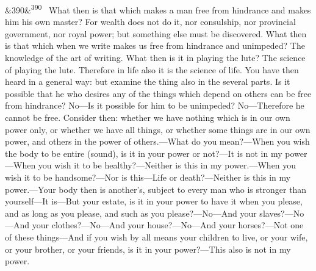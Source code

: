 \documentclass[12pt]{article}
\newcommand{\para}[1][]{\par\noindent\ifx&#1&\else\textsuperscript{\footnotesize #1}~\fi}
\begin{document}
\para[390] What then is that which makes a man free from hindrance and makes him his own master? For wealth does not do it, nor consulship, nor provincial government, nor royal power; but something else must be discovered. What then is that which when we write makes us free from hindrance and unimpeded? The knowledge of the art of writing. What then is it in playing the lute? The science of playing the lute. Therefore in life also it is the science of life. You have then heard in a general way: but examine the thing also in the several parts. Is it possible that he who desires any of the things which depend on others can be free from hindrance? No—Is it possible for him to be unimpeded? No—Therefore he cannot be free. Consider then: whether we have nothing which is in our own power only, or whether we have all things, or whether some things are in our own power, and others in the power of others.—What do you mean?—When you wish the body to be entire (sound), is it in your power or not?—It is not in my power—When you wish it to be healthy?—Neither is this in my power.—When you wish it to be handsome?—Nor is this—Life or death?—Neither is this in my power.—Your body then is another's, subject to every man who is stronger than yourself—It is—But your estate, is it in your power to have it when you please, and as long as you please, and such as you please?—No—And your slaves?—No—And your clothes?—No—And your house?—No—And your horses?—Not one of these things—And if you wish by all means your children to live, or your wife, or your brother, or your friends, is it in your power?—This also is not in my power.
\end{document}
